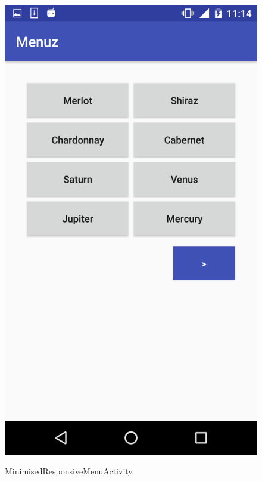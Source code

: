 \begin{figure}[!ht]
  \begin{center}
    \includegraphics[scale=0.22]{img/miniresp_menu.png}
    \label{fig:miniresp_menu}
    \caption{MinimisedResponsiveMenuActivity.}
  \end{center}
\end{figure}

\newpage

